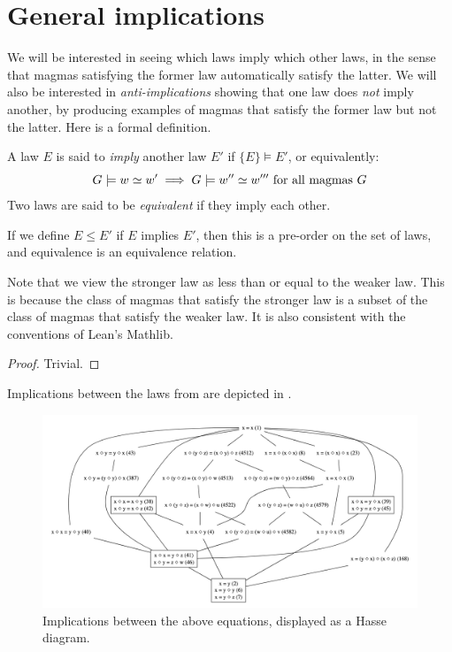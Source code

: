 \chapter{General implications}\label{general-implications-chapter}
We will be interested in seeing which laws imply which other laws, in the sense that magmas satisfying the former law automatically satisfy the latter. We will also be interested in \emph{anti-implications} showing that one law does \emph{not} imply another, by producing examples of magmas that satisfy the former law but not the latter. Here is a formal definition.

\begin{definition}[Implication]\label{impl}
  A law $E$ is said to \emph{imply} another law $E'$ if $\{E\} \models E'$, or equivalently:
  $$ G \models w  \simeq  w' \implies G \models w''  \simeq  w''' \hbox{ for all magmas } G$$
  Two laws are said to be \emph{equivalent} if they imply each other.
\end{definition}

\begin{lemma}\leanok\label{pre-order}
  If we define $E \leq E'$ if $E$ implies $E'$, then this is a pre-order on the set of laws, and equivalence is an equivalence relation.
\end{lemma}

Note that we view the stronger law as less than or equal to the weaker law. This is because the class of magmas that satisfy the stronger law is a subset of the class of magmas that satisfy the weaker law. It is also consistent with the conventions of Lean's Mathlib.

\begin{proof}\leanok
  Trivial.
\end{proof}

Implications between the laws from  are depicted in .

\begin{figure}
  \centering
  \includegraphics[width=1\linewidth]{../../images/subgraph.png}
  \caption{Implications between the above equations, displayed as a Hasse diagram.}
  \label{fig:implications}
\end{figure}

